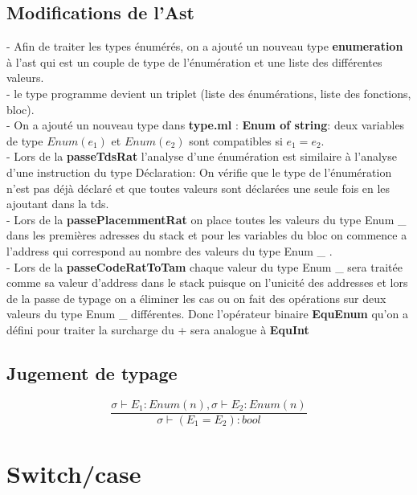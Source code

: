\documentclass{article}
\begin{document}
\subsection{Modifications de l'Ast}
- Afin de traiter les types énumérés, on a ajouté un nouveau type \textbf{enumeration} à l'ast qui est un couple de type de l'énumération et une liste des différentes
valeurs. \\
- le type programme devient un triplet (liste des énumérations, liste des fonctions, bloc). \\
- On a ajouté un nouveau type dans \textbf{type.ml} : \textbf{Enum of string}: deux variables de type 
$Enum (e_1)$ et $Enum (e_2)$ sont compatibles si $e_1 = e_2$. \\
- Lors de la \textbf{passeTdsRat} l'analyse d'une énumération est similaire à l'analyse d'une instruction du type Déclaration: On vérifie que le type 
de l'énumération n'est pas déjà déclaré et que toutes valeurs sont déclarées une seule fois en les ajoutant dans la tds.\\
- Lors de la \textbf{passePlacemmentRat} on place toutes les valeurs du type Enum \_ dans les premières adresses du stack et pour les variables du bloc on 
commence a l'address qui correspond au nombre des valeurs du type Enum \_ . \\ 
- Lors de la \textbf{passeCodeRatToTam} chaque valeur du type Enum \_ sera traitée comme sa valeur d'address dans le stack puisque on l'unicité des addresses et lors de 
la passe de typage on a éliminer les cas ou on fait des opérations sur deux valeurs du type Enum \_ différentes. Donc l'opérateur binaire \textbf{EquEnum} qu'on a défini pour
traiter la surcharge du + sera analogue à \textbf{EquInt}
\subsection{Jugement de typage}
\begin{equation}
    \frac{\sigma \vdash E_1 : Enum(n), \sigma \vdash E_2 : Enum(n)}{\sigma \vdash (E_1=E_2) : bool}
\end{equation}
\section{Switch/case}
\end{document}
